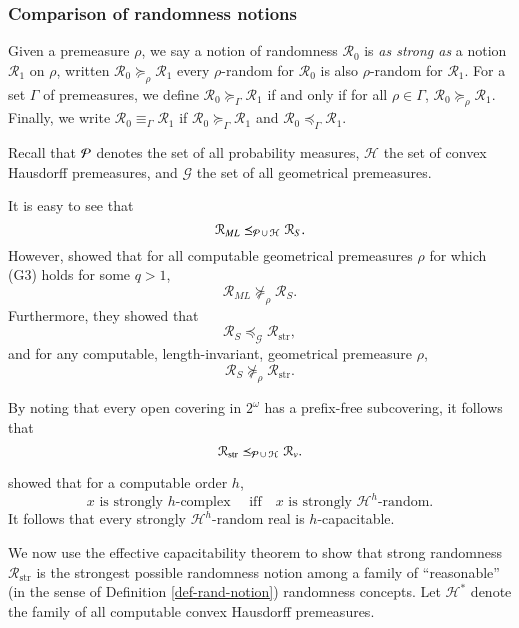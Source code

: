 \documentclass[11pt,reqno]{article}
\theoremstyle{plain}
\theoremstyle{definition}
\theoremstyle{remark}
\numberwithin{equation}{section}
\newcommand{\Cant}{\ensuremath{2^{\omega}}}
\newcommand{\Hmeas}{\ensuremath{\mathcal{H}}}
\newcommand{\Hm}[1]{\ensuremath{\Hmeas^{#1}}}
\newcommand{\Pmeas}{\ensuremath{\CMcal{P}}}
\begin{document}
\subsubsection*{Comparison of randomness notions}
Given a premeasure $\rho$, we say a notion of randomness $\mathcal{R}_0$ is \emph{as strong as} a notion $\mathcal{R}_1$ on $\rho$, written $\mathcal{R}_0 \succeq_\rho \mathcal{R}_1$ every $\rho$-random for $\mathcal{R}_0$ is also $\rho$-random for $\mathcal{R}_1$. For a set $\Gamma$ of premeasures, we define $\mathcal{R}_0 \succeq_\Gamma \mathcal{R}_1$ if and only if for all $\rho \in \Gamma$, $\mathcal{R}_0 \succeq_\rho \mathcal{R}_1$. Finally, we write $\mathcal{R}_0 \equiv_{\Gamma} \mathcal{R}_1$ if 
$\mathcal{R}_0 \succeq_\Gamma \mathcal{R}_1$ and $\mathcal{R}_0 \preceq_\Gamma \mathcal{R}_1$.

Recall that $\Pmeas$ denotes the set of all probability measures, $\Hmeas$ the set of convex Hausdorff premeasures, and $\mathcal{G}$ the set of all geometrical premeasures.

It is easy to see that 
\[
	\mathcal{R}_{ML} \preceq_{\Pmeas \, \cup\, \Hmeas} \mathcal{R}_{S}.
\]
However, \citet{reimann-stephan:2005} showed that for all computable geometrical premeasures $\rho$ for which (G3) holds for some $q > 1$,
\[
	\mathcal{R}_{ML} \nsucceq_{\rho} \mathcal{R}_{S}.
\] 
Furthermore, they showed that
\[
	\mathcal{R}_{S} \preceq_{\mathcal{G}} \mathcal{R}_{\operatorname{str}},
\]
and for any computable, length-invariant, geometrical premeasure $\rho$,
\[
	\mathcal{R}_{S} \nsucceq_{\rho} \mathcal{R}_{\operatorname{str}}.
\] 

By noting that every open covering in $\Cant$ has a prefix-free subcovering, it follows that 
\begin{equation} \label{equ-str-leq-veh}
	\mathcal{R}_{\operatorname{str}} \preceq_{\Pmeas \, \cup\, \Hmeas} \mathcal{R}_{v}.
\end{equation}

\medskip
\citet{calude-staiger-terwijn:2006} showed that for a computable order $h$,
\[
	x \text{ is strongly $h$-complex } \quad \text{iff} \quad x \text{ is strongly $\Hm{h}$-random.}
\]
It follows that every strongly $\Hm{h}$-random real is $h$-capacitable.


We now use the effective capacitability theorem to show that strong randomness $\mathcal{R}_{\operatorname{str}}$ is the strongest possible randomness notion among a family of ``reasonable'' (in the sense of Definition \ref{def-rand-notion}) randomness concepts. Let $\Hmeas^*$ denote the family of all computable convex Hausdorff premeasures.
\end{document}
